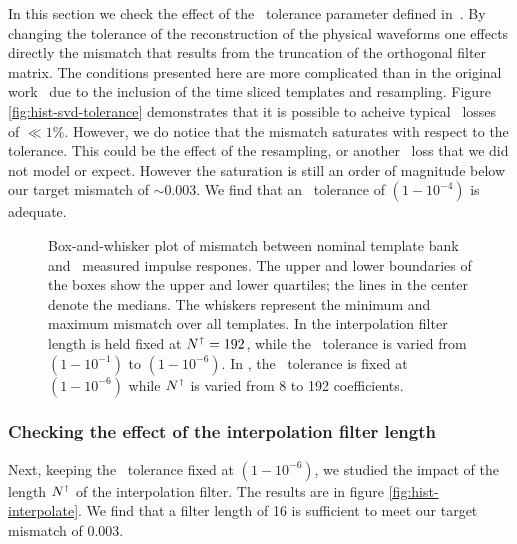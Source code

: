 In this section we check the effect of the \SVD\ tolerance parameter defined
in~\cite{Cannon:2010p10398}.  By changing the tolerance of the reconstruction of
the physical waveforms one effects directly the mismatch that results from the
truncation of the orthogonal filter matrix.  The conditions presented here are
more complicated than in the original work~\cite{Cannon:2010p10398} due to the
inclusion of the time sliced templates and resampling.    Figure \ref{fig:hist-svd-tolerance}
demonstrates that it is possible to acheive typical \SNR\ losses of $\ll1\%$.
However, we do notice that the mismatch saturates with respect to the tolerance.
This could be the effect of the resampling, or another \SNR\ loss that we did
not model or expect.  However the saturation is still an order of magnitude below our target mismatch of $\sim$0.003.  We find that an \SVD\ tolerance of
$\left(1-10^{-4}\right)$ is adequate. 
%
\begin{figure}
	\begin{center}
		\caption{Box-and-whisker plot of mismatch between nominal
template bank and \lloid\ measured impulse respones.  The upper and lower boundaries of
the boxes show the upper and lower quartiles; the lines in the center denote the medians.
The whiskers represent the minimum and maximum mismatch over all templates.  In 
 the interpolation filter length is held fixed
at $N^\shortuparrow = 192$, while the \SVD\ tolerance is varied from
$\left(1-10^{-1}\right)$ to $\left(1-10^{-6}\right)$.  In , the \SVD\ tolerance is fixed at $\left(1-10^{-6}\right)$ while $N^\shortuparrow$ is varied from 8 to 192 coefficients.}
	\end{center}
\end{figure}

\subsubsection{Checking the effect of the interpolation filter length}

Next, keeping the \SVD\ tolerance fixed at $\left(1-10^{-6}\right)$, we studied the
impact of the length $N^\shortuparrow$ of the interpolation filter.  The results are in
figure \ref{fig:hist-interpolate}.  We find that a filter length of 16 is sufficient
to meet our target mismatch of 0.003.

